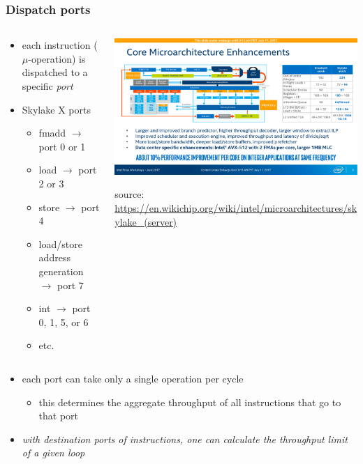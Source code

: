 \documentclass[12pt,dvipdfmx]{beamer}
\newcommand{\ao}[1]{{\color{blue}#1}}
\begin{document}
\begin{frame}[fragile]
\frametitle{Dispatch ports}
\begin{columns}
\begin{column}{0.5\textwidth}
\begin{itemize}
\item each instruction ($\mu$-operation) 
  is dispatched to a specific \ao{\emph{port}}
\item Skylake X ports
  \begin{itemize}
  \item fmadd $\rightarrow$ port 0 or 1
  \item load $\rightarrow$ port 2 or 3
  \item store $\rightarrow$ port 4
  \item load/store address generation $\rightarrow$ port 7
  \item int $\rightarrow$ port 0, 1, 5, or 6
  \item etc.
  \end{itemize}

\end{itemize}
\end{column}

\begin{column}{0.5\textwidth}
\includegraphics[width=\textwidth]{out/pdf/img/skylake_sp_buffer_windows.pdf}

{\tiny source: \url{https://en.wikichip.org/wiki/intel/microarchitectures/skylake_(server)}}
\end{column}
\end{columns}

\begin{itemize}
\item each port can take only a single operation per cycle
  \begin{itemize}
  \item this determines the aggregate throughput of all instructions
    that go to that port
  \end{itemize}
\item \ao{\it with destination ports of instructions, one can calculate
    the throughput limit of a given loop}
\end{itemize}
\end{frame}
\end{document}
